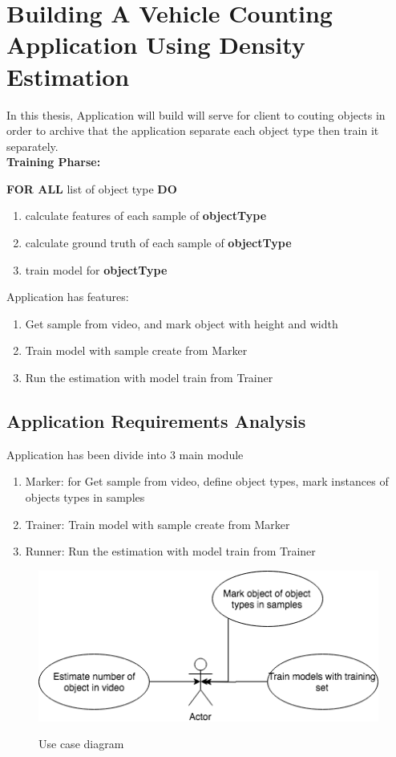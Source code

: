 \chapter{Building A Vehicle Counting Application Using Density Estimation}

In this thesis, Application will build will serve for client to couting objects in order to archive that the application separate each object type then train it separately. \\ 

\textbf{Training Pharse: }


 \textbf{FOR ALL} list of object type \textbf{DO}
        \begin{enumerate}
          \item calculate features of each sample of \textbf{objectType} 
          \item calculate ground truth of each sample of \textbf{objectType} 
          \item train model for \textbf{objectType} 
        \end{enumerate}
 
Application has features:
\begin{enumerate}
  \item Get sample from video, and mark object with height and width
  \item Train model with sample create from Marker
  \item Run the estimation with model train from Trainer
\end{enumerate}
\section{Application Requirements Analysis}
Application has been divide into  3 main module
\begin{enumerate}
  \item Marker: for Get sample from video, define object types, mark instances of objects types in samples
  \item Trainer: Train model with sample create from Marker
  \item Runner: Run the estimation with model train from Trainer
\end{enumerate}
\begin{center}
  \begin{figure}[H]
    \includegraphics[width=\textwidth]{Chapters/Fig/usecase}
    \label{usecasediagram}
    \caption{Use case diagram}
  \end{figure}
\end{center}

